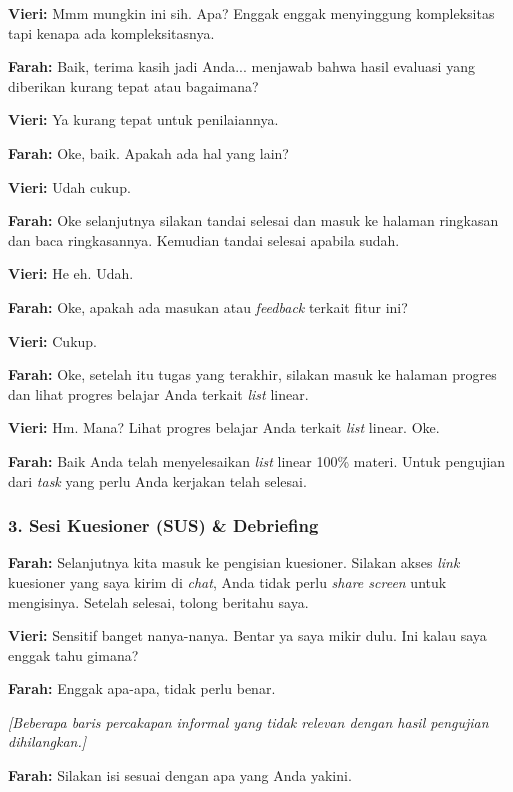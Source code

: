 \textbf{Vieri:} Mmm mungkin ini sih. Apa? Enggak enggak menyinggung kompleksitas tapi kenapa ada kompleksitasnya.

\textbf{Farah:} Baik, terima kasih jadi Anda... menjawab bahwa hasil evaluasi yang diberikan kurang tepat atau bagaimana?

\textbf{Vieri:} Ya kurang tepat untuk penilaiannya.

\textbf{Farah:} Oke, baik. Apakah ada hal yang lain?

\textbf{Vieri:} Udah cukup.

\textbf{Farah:} Oke selanjutnya silakan tandai selesai dan masuk ke halaman ringkasan dan baca ringkasannya. Kemudian tandai selesai apabila sudah.

\textbf{Vieri:} He eh. Udah.

\textbf{Farah:} Oke, apakah ada masukan atau \textit{feedback} terkait fitur ini?

\textbf{Vieri:} Cukup.

\textbf{Farah:} Oke, setelah itu tugas yang terakhir, silakan masuk ke halaman progres dan lihat progres belajar Anda terkait \textit{list} linear.

\textbf{Vieri:} Hm. Mana? Lihat progres belajar Anda terkait \textit{list} linear. Oke.

\textbf{Farah:} Baik Anda telah menyelesaikan \textit{list} linear 100\% materi. Untuk pengujian dari \textit{task} yang perlu Anda kerjakan telah selesai.

\bigskip

\subsubsection*{3. Sesi Kuesioner (SUS) \& Debriefing}

\textbf{Farah:} Selanjutnya kita masuk ke pengisian kuesioner. Silakan akses \textit{link} kuesioner yang saya kirim di \textit{chat}, Anda tidak perlu \textit{share screen} untuk mengisinya. Setelah selesai, tolong beritahu saya.

\textbf{Vieri:} Sensitif banget nanya-nanya. Bentar ya saya mikir dulu. Ini kalau saya enggak tahu gimana?

\textbf{Farah:} Enggak apa-apa, tidak perlu benar.

\textit{[Beberapa baris percakapan informal yang tidak relevan dengan hasil pengujian dihilangkan.]}

\textbf{Farah:} Silakan isi sesuai dengan apa yang Anda yakini.

